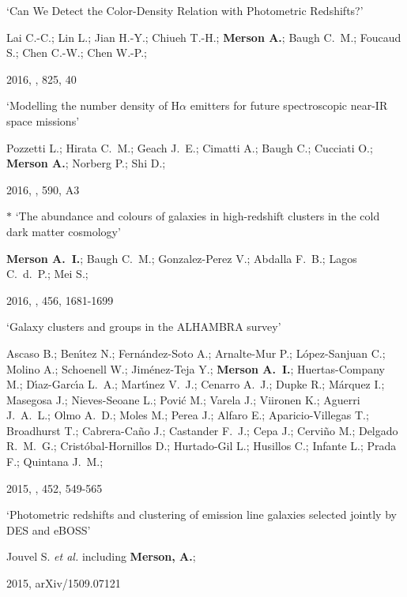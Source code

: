 \begin{etaremune}[leftmargin=15pt]
\item \label{itm:Lai2016} `Can We Detect the Color-Density Relation with Photometric Redshifts?'\newline
  \begin{small}Lai C.-C.; Lin L.; Jian H.-Y.; Chiueh T.-H.; \textbf{Merson A.}; Baugh C.~M.; Foucaud S.; Chen C.-W.; Chen W.-P.;\end{small} 2016, \apj, 825, 40

\item \label{itm:Pozzetti2016} `Modelling the number density of H{$\alpha$} emitters for future spectroscopic near-IR space missions'\newline
  \begin{small}Pozzetti L.; Hirata C.~M.; Geach J.~E.; Cimatti A.; Baugh C.; Cucciati O.; \textbf{Merson A.}; Norberg P.; Shi D.;\end{small} 2016, \aap, 590, A3

\item \label{itm:Merson2016}{\Large $\ast$} `The abundance and colours of galaxies in high-redshift clusters in the cold dark matter cosmology'\newline
  \begin{small}\textbf{Merson A.~I.}; Baugh C.~M.; Gonzalez-Perez V.; Abdalla F.~B.; Lagos C.~d.~P.; Mei S.;\end{small} 2016, \mnras, 456, 1681-1699

\item \label{itm:Ascaso2015} `Galaxy clusters and groups in the ALHAMBRA survey'\newline
  \begin{small}Ascaso B.; Ben{\'{\i}}tez N.; Fern{\'a}ndez-Soto A.; Arnalte-Mur P.; L{\'o}pez-Sanjuan C.; Molino A.; Schoenell W.; Jim{\'e}nez-Teja Y.; \textbf{Merson A.~I.}; Huertas-Company M.; D{\'{\i}}az-Garc{\'{\i}}a L.~A.; Mart{\'{\i}}nez V.~J.; Cenarro A.~J.; Dupke R.; M{\'a}rquez I.; Masegosa J.; Nieves-Seoane L.; Povi{\'c} M.; Varela J.; Viironen K.; Aguerri J.~A.~L.; Olmo A.~D.; Moles M.; Perea J.; Alfaro E.; Aparicio-Villegas T.; Broadhurst T.; Cabrera-Ca{\~n}o J.; Castander F.~J.; Cepa J.; Cervi{\~n}o M.; Delgado R.~M.~G.; Crist{\'o}bal-Hornillos D.; Hurtado-Gil L.; Husillos C.; Infante L.; Prada F.; Quintana J.~M.;\end{small} 2015, \mnras, 452, 549-565

\item \label{itm:Jouvel2015} `Photometric redshifts and clustering of emission line galaxies selected jointly by DES and eBOSS'\newline
  \begin{small}Jouvel S. \textit{et al.} including \textbf{Merson, A.};\end{small} 2015, arXiv/1509.07121


\end{etaremune}
